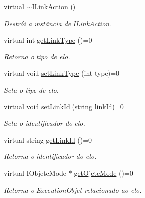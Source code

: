 \begin{DoxyCompactItemize}
\item 
virtual \hyperlink{classbr_1_1ufscar_1_1lince_1_1ginga_1_1wac_1_1editing_1_1ILinkAction_a20701ec352726a2f7beccbb3cd67e937}{$\sim$ILinkAction} ()
\begin{DoxyCompactList}\small\item\em Destrói a instância de \hyperlink{classbr_1_1ufscar_1_1lince_1_1ginga_1_1wac_1_1editing_1_1ILinkAction}{ILinkAction}. \item\end{DoxyCompactList}\item 
virtual int \hyperlink{classbr_1_1ufscar_1_1lince_1_1ginga_1_1wac_1_1editing_1_1ILinkAction_abf2d8eaacc9fc1d87df7a06edbbc8a93}{getLinkType} ()=0
\begin{DoxyCompactList}\small\item\em Retorna o tipo de elo. \item\end{DoxyCompactList}\item 
virtual void \hyperlink{classbr_1_1ufscar_1_1lince_1_1ginga_1_1wac_1_1editing_1_1ILinkAction_a9149a899e903cc72318112ef35a22f5f}{setLinkType} (int type)=0
\begin{DoxyCompactList}\small\item\em Seta o tipo de elo. \item\end{DoxyCompactList}\item 
virtual void \hyperlink{classbr_1_1ufscar_1_1lince_1_1ginga_1_1wac_1_1editing_1_1ILinkAction_afc323d02257e3756375d96c0fc6d25b3}{setLinkId} (string linkId)=0
\begin{DoxyCompactList}\small\item\em Seta o identificador do elo. \item\end{DoxyCompactList}\item 
virtual string \hyperlink{classbr_1_1ufscar_1_1lince_1_1ginga_1_1wac_1_1editing_1_1ILinkAction_ae7fc2b06a527bfb1a7e1f8485cbc686b}{getLinkId} ()=0
\begin{DoxyCompactList}\small\item\em Retorna o identificador do elo. \item\end{DoxyCompactList}\item 
virtual IObjetcMode $\ast$ \hyperlink{classbr_1_1ufscar_1_1lince_1_1ginga_1_1wac_1_1editing_1_1ILinkAction_ab0cd7d6ceaae080691a387a213eb30b0}{getOjetcMode} ()=0
\begin{DoxyCompactList}\small\item\em Retorna o ExecutionObjet relacionado ao elo. \item\end{DoxyCompactList}\end{DoxyCompactItemize}


